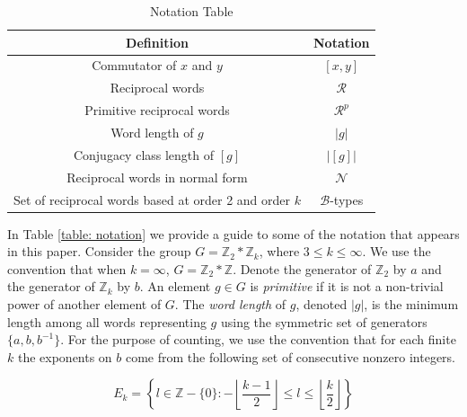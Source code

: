 \documentclass[11pt]{amsart}
\numberwithin{equation}{section}
\theoremstyle{plain}
\begin{document}
\begin{table} \label{table: notation}
\begin{center}
\begin{tabular}{|c|c| } 
 \hline
 {\bf Definition}& {\bf Notation}\\ 
\hline
Commutator of $x$ and $y$ &$[x,y]$  \\ 
\hline
Reciprocal words  & $\mathcal{R}$   \\ 
\hline
Primitive reciprocal words& $\mathcal{R}^{p}$\\
\hline 
Word length of $g$ & $|g|$\\
\hline
Conjugacy class length of $[g]$ & $|[g]|$ \\
\hline 
Reciprocal words in normal form & $\mathcal{N}$\\
\hline
Set of reciprocal words based at order 2 and order $k$ & $\mathcal{B}$-types \\
\hline
\hline 
\end{tabular}
\end{center}
\caption{Notation Table}
\label{tab:growthrates}
\end{table}
In Table \ref{table: notation} we provide a guide to some of the notation that appears in this paper. 
Consider the group $G=\mathbb{Z}_2\ast \mathbb{Z}_k$, where $3\leq k\leq\infty$.  We use the convention that when $k=\infty$,  $G=\mathbb{Z}_2\ast\mathbb{Z}$. Denote  the generator of $\mathbb{Z}_{2}$   by   $a$ and the generator of  $\mathbb{Z}_k$ by   $b$.  An element $g \in G$ is {\it primitive} if it is not a non-trivial power of another element of $G$. 
The {\it word length}  of $g$,  denoted  $|g|$, is  the minimum length among all words representing $g$ using the symmetric set of generators $\big\{a,b,b^{-1}\big\}$. For the purpose of counting, we use the convention that for each finite $k$ the exponents on $b$ come from the following set of consecutive nonzero integers.

\[E_k=\left\{l \in\mathbb{Z}-\{0\} : -\left\lfloor\frac{k-1}{2}\right\rfloor\leq l \leq \left\lfloor\frac{k}{2}\right\rfloor\right\}\]
 
\end{document}
